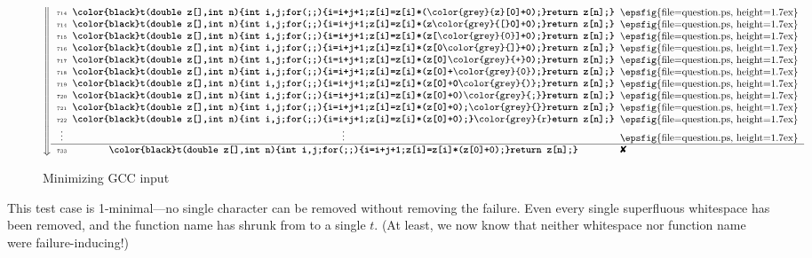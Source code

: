 \documentclass{acm_proc_article-sp}
\newcommand{\GCC}        {{\small GCC}\xspace}
\newcommand{\FAIL}{\text{\ding{56}}\xspace}
\newcommand{\UNRESOLVED}{\lower0.1ex\hbox{\epsfig{file=question.ps, 
      height=1.7ex}}}
\newcommand{\mathid}[1]{\text{\rmfamily\textit{#1}}}
\def\|#1|{\mathid{#1}}
\newcommand{\codeid}[1]{\text{\upshape\texttt{#1}}}
\def\<#1>{\codeid{#1}}
\theoremstyle{plain}
\begin{document}
\begin{figure*}[t]
\renewcommand{\a}[1]{{\textnormal{\texttt{\color{grey}{#1}}}}}
\newcommand{\n}[1]{{\tiny #1}}
\renewcommand{\t}[1]{\texttt{\textbf{\color{black}#1}}}
\scriptsize
$$
\left\Downarrow
\begin{tabular}{c@{\;\;}c@{\;\;}l}
\n{714} & \t{t(double z[],int n)\{int i,j;for(;;)\{i=i+j+1;z[i]=z[i]*(\a{z}[0]+0);\}return z[n];\}} & \UNRESOLVED \\
\n{714} & \t{t(double z[],int n)\{int i,j;for(;;)\{i=i+j+1;z[i]=z[i]*(z\a[0]+0);\}return z[n];\}} & \UNRESOLVED \\
\n{715} & \t{t(double z[],int n)\{int i,j;for(;;)\{i=i+j+1;z[i]=z[i]*(z[\a0]+0);\}return z[n];\}} & \UNRESOLVED \\
\n{716} & \t{t(double z[],int n)\{int i,j;for(;;)\{i=i+j+1;z[i]=z[i]*(z[0\a]+0);\}return z[n];\}} & \UNRESOLVED \\
\n{717} & \t{t(double z[],int n)\{int i,j;for(;;)\{i=i+j+1;z[i]=z[i]*(z[0]\a+0);\}return z[n];\}} & \UNRESOLVED \\
\n{718} & \t{t(double z[],int n)\{int i,j;for(;;)\{i=i+j+1;z[i]=z[i]*(z[0]+\a0);\}return z[n];\}} & \UNRESOLVED \\
\n{719} & \t{t(double z[],int n)\{int i,j;for(;;)\{i=i+j+1;z[i]=z[i]*(z[0]+0\a);\}return z[n];\}} & \UNRESOLVED \\
\n{720} & \t{t(double z[],int n)\{int i,j;for(;;)\{i=i+j+1;z[i]=z[i]*(z[0]+0)\a;\}return z[n];\}} & \UNRESOLVED \\
\n{721} & \t{t(double z[],int n)\{int i,j;for(;;)\{i=i+j+1;z[i]=z[i]*(z[0]+0);\a\}return z[n];\}} & \UNRESOLVED \\
\n{722} & \t{t(double z[],int n)\{int i,j;for(;;)\{i=i+j+1;z[i]=z[i]*(z[0]+0);\}\a{r}eturn z[n];\}} & \UNRESOLVED \\
\vdots & \vdots & \UNRESOLVED \\
\hline
\n{733} & \t{t(double z[],int n)\{int i,j;for(;;)\{i=i+j+1;z[i]=z[i]*(z[0]+0);\}return z[n];\}} & \FAIL \\
\end{tabular}
\right.
$$
\vspace{-\baselineskip}
\caption{Minimizing \GCC input \<bug.c>}
\label{fig:gcc}
\end{figure*}

This test case is 1-minimal---no single character can be removed
without removing the failure.  Even every single superfluous
white\-space has been removed, and the function name has shrunk from
\|mult| to a single $t$.  (At least, we now know that neither
whitespace nor function name were failure-inducing!)
\end{document}
